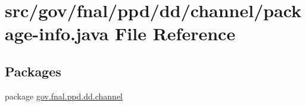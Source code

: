 \hypertarget{dd_2channel_2package-info_8java}{\section{src/gov/fnal/ppd/dd/channel/package-\/info.java File Reference}
\label{dd_2channel_2package-info_8java}
}
\subsection*{Packages}
\begin{DoxyCompactItemize}
\item 
package \hyperlink{namespacegov_1_1fnal_1_1ppd_1_1dd_1_1channel}{gov.\-fnal.\-ppd.\-dd.\-channel}
\end{DoxyCompactItemize}
